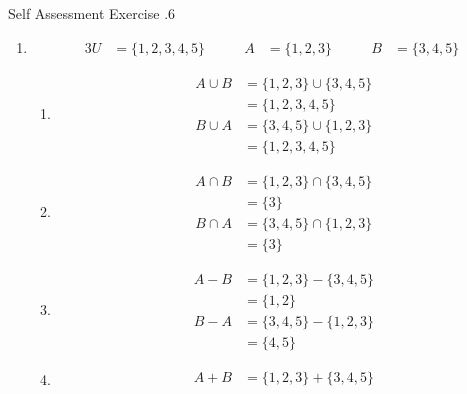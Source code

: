 \documentclass[../notes.tex]{subfiles}
\begin{document}
      \begin{exercisebox}{Self Assessment Exercise \thechapter.6}
        \begin{enumerate}
          \item \rule{0pt}{11pt} \vspace*{-25pt}
            \begin{alignat*}{3}
              U &= \{1, 2, 3, 4, 5\} \qquad & A &= \{1, 2, 3\} \qquad & B &= \{3, 4, 5\}
            \end{alignat*}
            \begin{enumerate}[label=(\alph*)]
              \item \rule{0pt}{11pt} \vspace*{-25pt}
                \begin{align*}
                  A \cup B &= \{1, 2, 3\} \cup \{3, 4, 5\}\\
                  &= \{1, 2, 3, 4, 5\}\\
                  B \cup A &= \{3, 4, 5\} \cup \{1, 2, 3\}\\
                  &= \{1, 2, 3, 4, 5\}
                \end{align*}
              \item \rule{0pt}{11pt} \vspace*{-25pt}
                \begin{align*}
                  A \cap B &= \{1, 2, 3\} \cap \{3, 4, 5\}\\
                  &= \{3\}\\
                  B \cap A &= \{3, 4, 5\} \cap \{1, 2, 3\}\\
                  &= \{3\}
                \end{align*}
              \item \rule{0pt}{11pt} \vspace*{-25pt}
                \begin{align*}
                  A - B &= \{1, 2, 3\} - \{3, 4, 5\}\\
                  &= \{1, 2\}\\
                  B - A &= \{3, 4, 5\} - \{1, 2, 3\}\\
                  &= \{4, 5\}
                \end{align*}
              \item \rule{0pt}{11pt} \vspace*{-25pt}
                \begin{align*}
                  A + B &= \{1, 2, 3\} + \{3, 4, 5\}\\

\end{align*}
\end{enumerate}
\end{enumerate}
\end{exercisebox}
\end{document}
